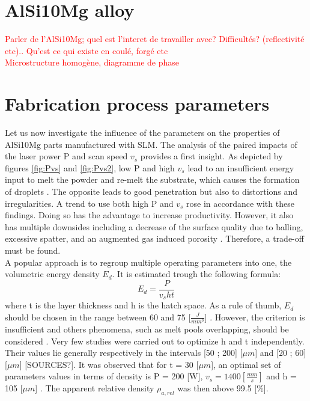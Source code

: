 \section{AlSi10Mg alloy}
\textcolor{red}{Parler de l'AlSi10Mg; quel est l'interet de travailler avec? Difficultés? (reflectivité etc).. Qu'est ce qui existe en coulé, forgé etc}\\
\textcolor{red}{Microstructure homogène, diagramme de phase}\\

\section{Fabrication process parameters}
\label{pp}
Let us now investigate the influence of the parameters on the properties of AlSi10Mg parts manufactured with SLM. The analysis of the paired impacts of the laser power P and scan speed $v_s$ provides a first insight. As depicted by figures \ref{fig:Pvs} and \ref{fig:Pvs2}, low P and high $v_s$ lead to an insufficient energy input to melt the powder and re-melt the substrate, which causes the formation of droplets \parencite{Kempen110817} . The opposite leads to good penetration but also to distortions and irregularities.   A trend to use both high P and $v_s$ rose in accordance with these findings. Doing so has the advantage to increase productivity. However, it also has multiple downsides including a decrease of the surface quality due to balling, excessive spatter, and an augmented gas induced porosity \parencite{Mertens170406}. Therefore, a trade-off must be found. \\

A popular approach is to regroup multiple operating parameters into one, the volumetric energy density $E_d$. It is estimated trough the following formula: 
$$E_d=\frac{P}{v_s h t} $$
where t is the layer thickness and h is the hatch space. As a rule of thumb, $E_d$ should be chosen in the range between 60 and 75 [$\frac{J}{mm^3}$] \parencite{Read150417}. However, the criterion is insufficient and others phenomena, such as melt pools overlapping, should be considered \parencite{Tang170309}. Very few studies were carried out to optimize h and t independently. Their values lie generally respectively in the intervals [50 ; 200] [$\mu m$] and [20 ; 60] [$\mu m$] [SOURCES?]. It was observed that for t = 30 [$\mu m$], an optimal set of parameters values in terms of density is P = 200 [W], $v_s=1400 [\frac{mm}{s}]$ and h = 105 [$\mu m$] \parencite{Kempen110817}. The apparent relative density $\rho_{a,rel}$ was then above 99.5 [\%].\\

